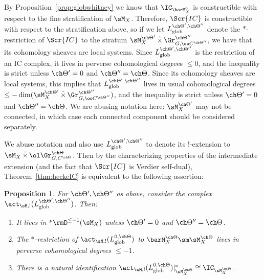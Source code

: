 \documentclass[final]{amsart}
\newtheorem{prop}[subsubsection]{Proposition}
\theoremstyle{remark}
\theoremstyle{definition}
\DeclareMathOperator*{\ttimes}{\tilde\times}
\numberwithin{equation}{section}
\begin{document}
\subsubsection{} \label{sect:ICglobineq}
By Proposition~\ref{prop:globwhitney} we know that 
$\IC_{\barM_X^0}$ is constructible with respect to the fine stratification of 
$\sM_X$. Therefore, $\Scr{IC}$ is constructible
with respect to the stratification above, so 
if we let $L_{\mathrm{glob}}^{\ch\Theta', \ch\Theta''}$ denote
the $*$-restriction of $\Scr{IC}$ to the stratum 
$\sM_X^{\ch\Theta'} \ttimes \Gr^{\ch\Theta''}_{G,\oo C^{\ch\Theta''}}$, we have that its cohomology sheaves are local systems. 
Since $L^{\ch\Theta', \ch\Theta''}_{\mathrm{glob}}$ is the 
restriction of an IC complex, it lives in perverse cohomological degrees 
$\le 0$, and the inequality is strict unless $\ch\Theta'=0$ and $\ch\Theta''=\ch\Theta$. 
Since its cohomology sheaves are local systems, this implies that 
$L^{\ch\Theta', \ch\Theta''}_{\mathrm{glob}}$ 
lives in usual cohomological degrees 
$\le -\dim( \sM_X^{\ch\Theta'} \ttimes \Gr^{\ch\Theta''}_{G,\oo C^{\ch\Theta''}})$, and the inequality is strict unless 
$\ch\Theta'=0$ and $\ch\Theta''=\ch\Theta$. 
We are abusing notation here: $\sM^{\ch\Theta'}_X$ may not be connected, in which case each connected component should be considered separately. 
 
\smallskip

We abuse notation and also use $L^{\ch\Theta',\ch\Theta''}_{\mathrm{glob}}$
to denote its $!$-extension to $\sM_X \ttimes \ol\Gr^{\ch\Theta}_{G, C^{\ch\Theta}}$. 
Then by the characterizing properties of the intermediate extension 
(and the fact that $\Scr{IC}$ is Verdier self-dual), 
Theorem~\ref{thm:heckeIC} is equivalent
to the following assertion: 

\begin{prop} \label{prop:heckeIC}
For $\ch\Theta',\ch\Theta''$ as above, 
consider the complex $\act_{\sM,!}(L^{\ch\Theta',\ch\Theta''}_{\mathrm{glob}})$.  
Then:
\begin{enumerate}
\item It lives in $^p\rmD^{\le -1}(\sM_X)$ unless $\ch\Theta'=0$ and $\ch\Theta''=\ch\Theta$.
\item The $*$-restriction of 
$\act_{\sM,!}(L^{0,\ch\Theta}_{\mathrm{glob}})$ to $\barM^{\ch\Theta}_X\sm \sM^{\ch\Theta}_X$ lives in perverse cohomological degrees $\le -1$.
\item There is a natural identification
$\act_{\sM,!}(L^{0,\ch\Theta}_{\mathrm{glob}})|^*_{\sM^{\ch\Theta}_X} \cong \IC_{\sM^{\ch\Theta}_X}$. 
\end{enumerate}
\end{prop}
\end{document}
